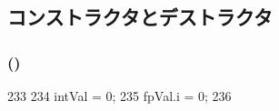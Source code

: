 \subsection{コンストラクタとデストラクタ}
\hypertarget{structInOrderDynInst_1_1InstValue_a30b0b518a30ff1628921ea609230b510}{
\subsubsection[{InstValue}]{ ()}}
\label{structInOrderDynInst_1_1InstValue_a30b0b518a30ff1628921ea609230b510}



\begin{DoxyCode}
233         {
234             intVal = 0;
235             fpVal.i = 0;
236         }
\end{DoxyCode}


